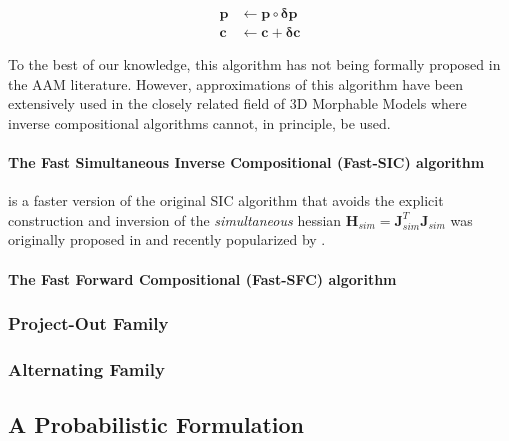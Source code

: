 \begin{align}
\mathbf{p} & \leftarrow \mathbf{p} \circ \mathbf{\delta \mathbf{p}} \\
\mathbf{c} & \leftarrow \mathbf{c} + \mathbf{\delta \mathbf{c}}
\end{align}

To the best of our knowledge, this algorithm has not being formally proposed in the AAM literature. However, approximations of this algorithm have been extensively used in the closely related field of 3D Morphable Models \cite{} where inverse compositional algorithms cannot, in principle, be used.


\paragraph{The Fast Simultaneous Inverse Compositional (Fast-SIC) algorithm}

is a faster version of the original SIC algorithm that avoids the explicit construction and inversion of the \emph{simultaneous} hessian $\mathbf{H}_{sim} = \mathbf{J}_{sim}^T\mathbf{J}_{sim}$ was originally proposed in \cite{} and recently popularized by \cite{}.

\paragraph{The Fast Forward Compositional (Fast-SFC) algorithm}

\subsubsection{Project-Out Family}

\subsubsection{Alternating Family}


\subsection{A Probabilistic Formulation}

